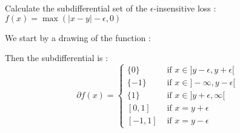\begin{exercise}[]{}
	Calculate the subdifferential set of the $ \epsilon $-insensitive loss : \\$ f(x) = \max(|x-y|-\epsilon, 0) $
\end{exercise}

\begin{solution}[]
	We start by a drawing of the function :
\begin{figure}[h!]
\end{figure}

Then the subdifferential is :
\begin{equation*}
	\partial f(x) =
\begin{cases}
	\{ 0 \} &\text{ if } x \in ]y-\epsilon, y+\epsilon[ \\
	\{ -1 \} &\text{ if } x \in ]-\infty, y-\epsilon[ \\
	\{ 1 \} &\text{ if } x \in ]y+\epsilon,\infty[ \\
	[0,1] &\text{ if } x = y+\epsilon \\
	[-1,1] &\text{ if } x = y-\epsilon
\end{cases}
\end{equation*}

\end{solution}
